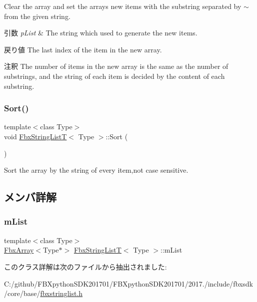 Clear the array and set the array\textquotesingle{}s new items with the substring separated by \textquotesingle{}$\sim$\textquotesingle{} from the given string. 
\begin{DoxyParams}{引数}
{\em p\+List} & The string which used to generate the new items. \\
\hline
\end{DoxyParams}
\begin{DoxyReturn}{戻り値}
The last index of the item in the new array. 
\end{DoxyReturn}
\begin{DoxyRemark}{注釈}
The number of items in the new array is the same as the number of substrings, and the string of each item is decided by the content of each substring. 
\end{DoxyRemark}
\mbox{\label{class_fbx_string_list_t_a2fc06dea6d617b78af117cc4b8d97e3b}} 
\subsubsection{\texorpdfstring{Sort()}{Sort()}}
{\footnotesize\ttfamily template$<$class Type$>$ \\
void \hyperlink{class_fbx_string_list_t}{Fbx\+String\+ListT}$<$ Type $>$\+::Sort (\begin{DoxyParamCaption}{ }\end{DoxyParamCaption})}



Sort the array by the string of every item,not case sensitive. 



\subsection{メンバ詳解}
\mbox{\label{class_fbx_string_list_t_a4e123cd88e7d73c0ce3ff22cc5f6e2cc}} 
\subsubsection{\texorpdfstring{m\+List}{mList}}
{\footnotesize\ttfamily template$<$class Type$>$ \\
\hyperlink{class_fbx_array}{Fbx\+Array}$<$Type$\ast$$>$ \hyperlink{class_fbx_string_list_t}{Fbx\+String\+ListT}$<$ Type $>$\+::m\+List\hspace{0.3cm}{\ttfamily [protected]}}



このクラス詳解は次のファイルから抽出されました\+:\begin{DoxyCompactItemize}
\item 
C\+:/github/\+F\+B\+Xpython\+S\+D\+K201701/\+F\+B\+Xpython\+S\+D\+K201701/2017./include/fbxsdk/core/base/\hyperlink{fbxstringlist_8h}{fbxstringlist.\+h}\end{DoxyCompactItemize}
